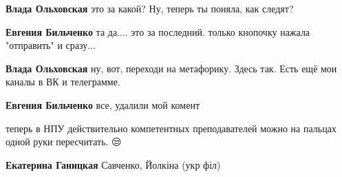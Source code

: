 \begin{itemize}
\begin{itemize}
 
\textbf{Влада Ольховская} это за какой? Ну, теперь ты поняла, как следят?

 
\textbf{Евгения Бильченко} та да.... это за последний. только кнопочку нажала "отправить" и сразу...

 
\textbf{Влада Ольховская} ну, вот, переходи на метафорику. Здесь так. Есть ещё мои каналы в ВК и телеграмме.

 
\textbf{Евгения Бильченко} все, удалили мой комент

\end{itemize}

 
теперь в НПУ действительно компетентных преподавателей можно на пальцах одной руки пересчитать. 😒

\begin{itemize}
 
\textbf{Екатерина Ганицкая} Савченко, Йолкіна (укр філ)

 

\end{itemize}
\end{itemize}
